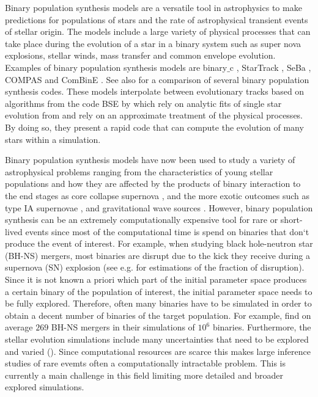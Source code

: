 \documentclass[a4paper,fleqn,usenatbib]{mnras}
\begin{document}
Binary population synthesis models are a versatile tool in astrophysics to make predictions for populations of stars and the rate of astrophysical transient events of stellar origin. 
The models include a large variety of physical processes that can take place during the evolution of a star in a binary system such as super nova explosions, stellar winds, mass transfer and common envelope evolution. Examples of binary population synthesis models are binary$\_$c \citep{izzard2004new, izzard2006population, izzard2009population, de2013rotation, schneider2015evolution}, StarTrack \citep{belczynski2002comprehensive, belczynski2008compact}, SeBa \citep{portegies1996population, portegies1998formation, nelemans2001population, toonen2013effect}, COMPAS \citep{stevenson2017formation, barrett2018accuracy, vigna2018formation} and ComBinE \citep{kruckow2018progenitors}. See also \cite{toonen2014popcorn} for a comparison of several binary population synthesis codes.  These models interpolate between evolutionary tracks based on algorithms from the code BSE by \citep{hurley2000comprehensive,hurley2002evolution} which rely on analytic fits of single star evolution from \citep{pols1998stellar} and rely on an approximate treatment of the physical processes.  By doing so, they present a rapid code that can compute the evolution of many stars within a simulation.  

Binary population synthesis models have now been used to study a variety of astrophysical problems ranging from the characteristics of young stellar populations and how they are affected by the products of binary interaction \citep{de2013rotation,schneider2014bonnsai}  to the end stages as core collapse supernova \citep{zapartas2017delay}, and the more exotic outcomes such as type IA supernovae \citep{toonen2012supernova}, and gravitational wave sources \citep{belczynski2017gw170104}.
However, binary population synthesis can be an  extremely computationally expensive  tool for rare  or short-lived events since most of the computational time is spend on binaries that don`t produce the event of interest. For example, when studying black hole-neutron star (BH-NS) mergers, most binaries are disrupt due to the  kick they receive during a supernova (SN) explosion (see e.g. \citealt{renzo2018massive} for estimations of the fraction of disruption). 
Since it is not known a priori which part of the initial parameter space produces a certain binary of the population of interest, the initial parameter space needs to be fully explored. Therefore, often many binaries have to be simulated in order to obtain a decent number of binaries of the target population. For example,  \citet{belczynski2002comprehensive} find on average $269$ BH-NS mergers in their simulations of $10^6$ binaries. Furthermore,  the stellar evolution simulations include many uncertainties that need to be explored and varied (\citealt{postnov2014evolution, de2015merger, de2017dawes}). Since  computational resources are scarce this makes large inference studies of rare evemts often a computationally intractable problem. This is currently a main challenge in this field limiting more detailed and broader explored simulations.
\end{document}
